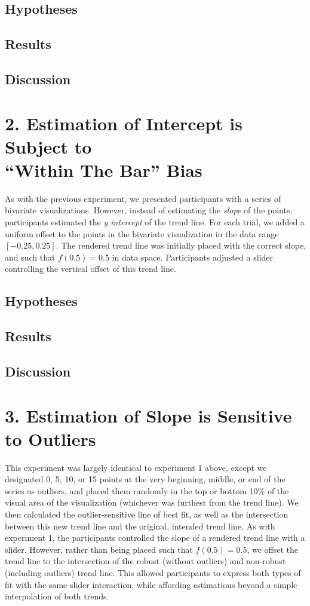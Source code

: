 \documentclass[chi_draft]{sigchi}
\begin{document}
\subsection{Hypotheses}
\subsection{Results}
\subsection{Discussion}

\section{2. Estimation of Intercept is Subject to \\ ``Within The Bar'' Bias}

As with the previous experiment, we presented participants with a series of bivariate visualizations. However, instead of estimating the \emph{slope} of the points, participants estimated the \emph{y intercept} of the trend line. For each trial, we added a uniform offset to the points in the bivariate visualization in the data range $[-0.25,0.25]$. The rendered trend line was initially placed with the correct slope, and such that $f(0.5)=0.5$ in data space. Participants adjusted a slider controlling the vertical offset of this trend line. 

\subsection{Hypotheses}
\subsection{Results}
\subsection{Discussion}

\section{3. Estimation of Slope is Sensitive to Outliers}

This experiment was largely identical to experiment 1 above, except we designated 0, 5, 10, or 15 points at the very beginning, middle, or end of the series as outliers, and placed them randomly in the top or bottom 10\% of the visual area of the visualization (whichever was furthest from the trend line). We then calculated the outlier-sensitive line of best fit, as well as the intersection between this new trend line and the original, intended trend line. As with experiment 1, the participants controlled the slope of a rendered trend line with a slider. However, rather than being placed such that $f(0.5)=0.5$, we offset the trend line to the intersection of the robust (without outliers) and non-robust (including outliers) trend line. This allowed participants to express both types of fit with the same slider interaction, while affording estimations beyond a simple interpolation of both trends.
\end{document}

